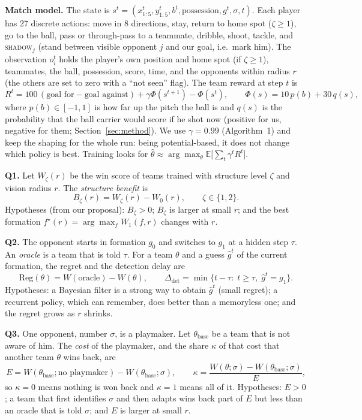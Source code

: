 \documentclass{article}
\begin{document}
\textbf{Match model.} The state is $s^t=(x^t_{1:5},y^t_{1:5},b^t,\text{possession},g^t,\sigma,t)$. Each player has 27
discrete actions: move in 8 directions, stay, return to home spot ($\zeta\ge1$), go to the ball, pass or through-pass
to a teammate, dribble, shoot, tackle, and \textsc{shadow}$_j$ (stand between visible opponent $j$ and our goal, i.e.\
mark him). The observation $o_i^t$ holds the player's own position and home spot (if $\zeta\ge1$), teammates, the ball,
possession, score, time, and the opponents within radius $r$ (the others are set to zero with a ``not seen'' flag). The
team reward at step $t$ is
\begin{equation}
R^t=100\,(\text{goal for}-\text{goal against})+\gamma\Phi(s^{t+1})-\Phi(s^t),\qquad
\Phi(s)=10\,p(b)+30\,q(s),
\label{eq:reward}
\end{equation}
where $p(b)\in[-1,1]$ is how far up the pitch the ball is and $q(s)$ is the probability that the ball carrier would
score if he shot now (positive for us, negative for them; Section~\ref{sec:method}). We use $\gamma=0.99$ (Algorithm~1) and keep the
shaping for the whole run: being potential-based, it does not change which policy is best. Training looks for
$\hat\theta\approx\arg\max_\theta\mathbb E\big[\sum_t\gamma^tR^t\big]$.

\textbf{Q1.} Let $W_\zeta(r)$ be the win score of teams trained with structure level $\zeta$ and vision radius $r$.
The \emph{structure benefit} is
\begin{equation}
B_\zeta(r)=W_\zeta(r)-W_0(r),\qquad \zeta\in\{1,2\}.
\label{eq:q1}
\end{equation}
Hypotheses (from our proposal): $B_\zeta>0$; $B_\zeta$ is larger at small $r$; and the best formation
$f^\star(r)=\arg\max_f W_1(f,r)$ changes with $r$.

\textbf{Q2.} The opponent starts in formation $g_0$ and switches to $g_1$ at a hidden step $\tau$. An \emph{oracle} is a
team that is told $\tau$. For a team $\theta$ and a guess $\hat g^t$ of the current formation, the regret and the
detection delay are
\begin{equation}
\mathrm{Reg}(\theta)=W(\text{oracle})-W(\theta),\qquad
\Delta_{\text{det}}=\min\{t-\tau:\;t\ge\tau,\;\hat g^t=g_1\}.
\label{eq:q2}
\end{equation}
Hypotheses: a Bayesian filter is a strong way to obtain $\hat g^t$ (small regret); a recurrent policy, which can
remember, does better than a memoryless one; and the regret grows as $r$ shrinks.

\textbf{Q3.} One opponent, number $\sigma$, is a playmaker. Let $\theta_{\text{base}}$ be a team that is not aware of
him. The \emph{cost} of the playmaker, and the share $\kappa$ of that cost that another team $\theta$ wins back, are
\begin{equation}
E=W(\theta_{\text{base}};\text{no playmaker})-W(\theta_{\text{base}};\sigma),\qquad
\kappa=\frac{W(\theta;\sigma)-W(\theta_{\text{base}};\sigma)}{E},
\label{eq:q3}
\end{equation}
so $\kappa=0$ means nothing is won back and $\kappa=1$ means all of it. Hypotheses: $E>0$; a team that first
identifies $\sigma$ and then adapts wins back part of $E$ but less than an oracle that is told $\sigma$; and $E$ is
larger at small $r$.
\end{document}
